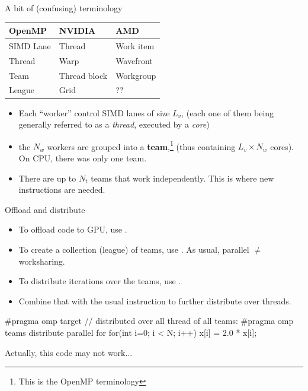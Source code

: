 \begin{frame}{A bit of (confusing) terminology}
	\begin{table}
		\begin{tabular}{lll}
			\toprule
			OpenMP & NVIDIA & AMD\\
			\midrule
			SIMD Lane & Thread & Work item \\
			Thread & Warp &  Wavefront \\
			Team & Thread block & Workgroup\\ 
			League & Grid & ?? \\
			\bottomrule
		\end{tabular}
	\end{table}
	\begin{itemize}
		\item Each ``worker'' control SIMD lanes of size $L_v$, (each one of them being generally referred to as a \textit{thread}, executed by a \textit{core})
		\item the $N_w$ workers are grouped into a \textbf{team},\footnote{This is the OpenMP terminology} (thus containing $L_v \times N_w$ cores). On CPU, there was only one team.
		\item There are up to $N_t$ teams that work independently. This is where new instructions are needed.
	\end{itemize}
\end{frame}

\begin{frame}[fragile]{Offload and distribute}
	\begin{itemize}
		\item To offload code to GPU, use .
		\item To create a collection (league) of teams, use . As usual, parallel $\neq$ worksharing.
		\item To distribute iterations over the teams, use .
		\item Combine that with the usual instruction to further distribute over threads.
	\end{itemize}
\begin{ccode}
#pragma omp target
{
	// distributed over all thread of all teams:
	#pragma omp teams distribute parallel for
	for(int i=0; i < N; i++) 
		x[i] = 2.0 * x[i];
}
\end{ccode}
Actually, this code may not work...
\end{frame}


